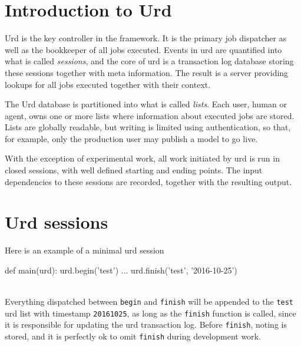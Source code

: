 \section{Introduction to Urd}

Urd is the key controller in the framework.  It is the primary job
dispatcher as well as the bookkeeper of all jobs executed.  Events in
urd are quantified into what is called \textsl{sessions}, and the core
of urd is a transaction log database storing these sessions together
with meta information.  The result is a server providing lookups for
all jobs executed together with their context.

The Urd database is partitioned into what is called \textsl{lists}.
Each user, human or agent, owns one or more lists where information
about executed jobs are stored.  Lists are globally readable, but
writing is limited using authentication, so that, for example, only
the production user may publish a model to go live.

With the exception of experimental work, all work initiated by urd is
run in closed sessions, with well defined starting and ending points.
The input dependencies to these sessions are recorded, together with
the resulting output.



\section{Urd sessions}

Here is an example of a minimal urd session
\\
\begin{python}
def main(urd):
  urd.begin('test')
  ...
  urd.finish('test', '2016-10-25')
\end{python}
\\
Everything dispatched between \texttt{begin} and \texttt{finish} will
be appended to the \texttt{test} urd list with timestamp
\texttt{20161025}, as long as the \texttt{finish} function is called,
since it is responsible for updating the urd transaction log.  Before
\texttt{finish}, noting is stored, and it is perfectly ok to omit
\texttt{finish} during development work.

